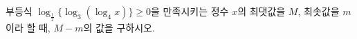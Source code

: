 부등식 $\log_{\frac{1}{2}}\{\log_3(\log_4 x)\}\ge 0$을 만족시키는 정수 $x$의 최댓값을 $M$, 최솟값을 $m$이라 할 때, $M-m$의 값을 구하시오.

